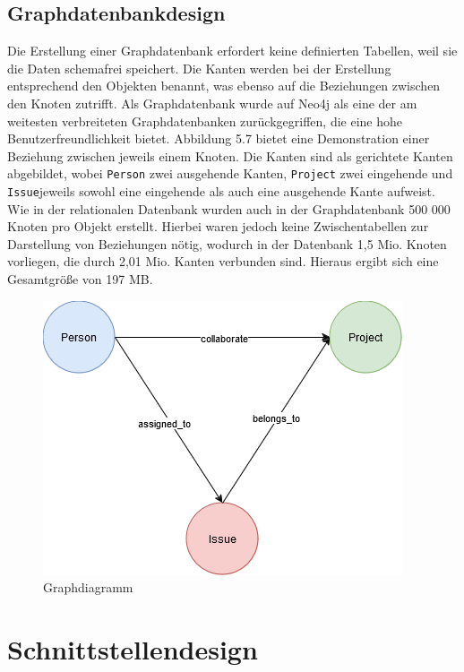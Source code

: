 \subsection{Graphdatenbankdesign} %
\label{sec:graphsdatenbankdesign}
Die Erstellung einer Graphdatenbank erfordert keine definierten Tabellen, weil sie die Daten schemafrei speichert. Die Kanten werden bei der Erstellung entsprechend den Objekten benannt, was ebenso auf die Beziehungen zwischen den Knoten zutrifft. Als Graphdatenbank wurde auf Neo4j als eine der am weitesten verbreiteten Graphdatenbanken zurückgegriffen, die eine hohe Benutzerfreundlichkeit bietet. Abbildung 5.7 bietet eine Demonstration einer Beziehung zwischen jeweils einem Knoten. Die Kanten sind als gerichtete Kanten abgebildet, wobei \texttt{Person} zwei ausgehende Kanten, \texttt{Project} zwei eingehende und \texttt{Issue}jeweils sowohl eine eingehende als auch eine ausgehende Kante aufweist. Wie in der relationalen Datenbank wurden auch in der Graphdatenbank 500 000 Knoten pro Objekt erstellt. Hierbei waren jedoch keine Zwischentabellen zur Darstellung von Beziehungen nötig, wodurch in der Datenbank 1,5 Mio. Knoten vorliegen, die durch 2,01 Mio. Kanten verbunden sind. Hieraus ergibt sich eine Gesamtgröße von 197 MB.

\begin{figure}[H]
	\centering
	\includegraphics[scale=.8]{Illustrations/graph_diagram}
	\caption{Graphdiagramm}
\end{figure}

\newpage
\section{Schnittstellendesign} %
\label{sec:schnittstellendesign}

